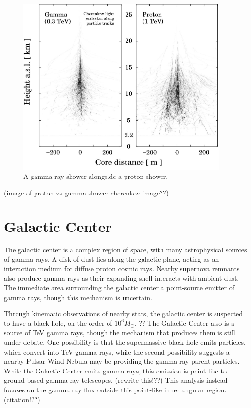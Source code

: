 \begin{figure}[ht]
  \begin{center}
    \includegraphics[width=0.95\textwidth]{images/showers_gamma_proton}
    \caption[Gamma Ray and Proton Showers]{A gamma ray shower alongside a proton shower.\cite{Bernlohr2008149}}\label{fig:gamma_vs_proton_airshower}
  \end{center}
\end{figure}

(image of proton vs gamma shower cherenkov image??)


\section{Galactic Center}
The galactic center is a complex region of space, with many astrophysical sources of gamma rays.
A disk of dust lies along the galactic plane, acting as an interaction medium for diffuse proton cosmic rays.
Nearby supernova remnants also produce gamma-rays as their expanding shell interacts with ambient dust.
The immediate area surrounding the galactic center a point-source emitter of gamma rays, though this mechanism is uncertain.

Through kinematic observations of nearby stars, the galactic center is suspected to have a black hole, on the order of $10^6 M_{\odot}$. ??
The Galactic Center also is a source of TeV gamma rays, though the mechanism that produces them is still under debate.
One possibility is that the supermassive black hole emits particles, which convert into TeV gamma rays, while the second possibility suggests a nearby Pulsar Wind Nebula may be providing the gamma-ray-parent particles.
While the Galactic Center emits gamma rays, this emission is point-like to ground-based gamma ray telescopes. (rewrite this!??)
This analysis instead focuses on the gamma ray flux outside this point-like inner angular region. (citation!??)


